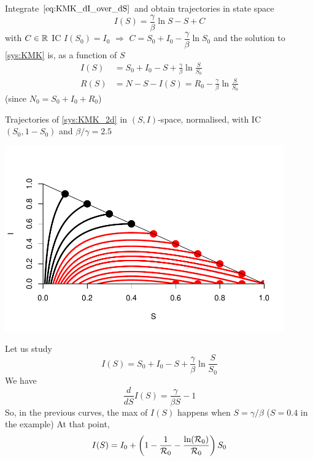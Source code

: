 \documentclass[aspectratio=169]{beamer}\usepackage[]{graphicx}\usepackage[]{xcolor}
\begin{document}
\begin{frame}{}
  Integrate $\eqref{eq:KMK_dI_over_dS}$ and obtain trajectories in state space
  $$
  I(S)=\frac\gamma\beta \ln S-S+C
  $$
  with $C\in\mathbb{R}$
  \vfill
  IC $I(S_0)=I_0$ $\Rightarrow$ $C=S_0+I_0-\dfrac \gamma\beta \ln S_0$ and the solution to \eqref{sys:KMK} is, as a function of $S$
  \begin{align*}
  I(S)&=S_0+I_0-S+\frac\gamma\beta \ln \frac S{S_0} \\
  R(S)&=N-S-I(S)=R_0-\frac\gamma\beta \ln \frac S{S_0}
  \end{align*}
  (since $N_0=S_0+I_0+R_0$)
\end{frame}




\begin{frame}
Trajectories of \eqref{sys:KMK_2d} in $(S,I)$-space, normalised, with IC $(S_0,1-S_0)$ and $\beta/\gamma=2.5$
\vfill
\begin{center}
\includegraphics[width=0.9\textwidth]{FIGS/course-01-KMK_SI_plane-1.pdf}
\end{center}
\end{frame}



\begin{frame}{}
  Let us study
  $$
  I(S)=S_0+I_0-S+\frac\gamma\beta \ln \frac S{S_0} 
  $$
  We have
  $$
  \frac{d}{dS}I(S) = \frac{\gamma}{\beta S}-1
  $$
  So, in the previous curves, the max of $I(S)$ happens when $S=\gamma/\beta$ ($S=0.4$ in the example)
  \vfill
  At that point,
  $$
  I(S) = I_0+\left(
    1-\frac{1}{\mathcal{R}_0} - \frac{\ln(\mathcal{R}_0)}{\mathcal{R}_0}
  \right)S_0
  $$
\end{frame}
\end{document}
